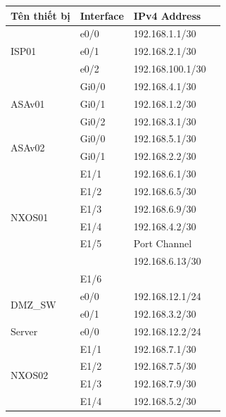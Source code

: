 \documentclass[13pt]{article}
\begin{document}
\begin{enumerate}
\begin{table}[h!]
    \centering
    \begin{tabular}{|p{3cm}|p{3cm}|p{4cm}|p{3cm}|}
        \hline
        \textbf{Tên thiết bị} & \textbf{Interface} & \textbf{IPv4 Address} \\ \hline
        \multirow{3}{*}{ISP01} & e0/0 & 192.168.1.1/30 \\ \cline{2-3}
                               & e0/1 & 192.168.2.1/30 \\ \cline{2-3}
                               & e0/2 & 192.168.100.1/30 \\ \hline
        \multirow{3}{*}{ASAv01} & Gi0/0 & 192.168.4.1/30 \\ \cline{2-3}
                                & Gi0/1 & 192.168.1.2/30 \\ \cline{2-3}
                                & Gi0/2 & 192.168.3.1/30 \\ \hline
        \multirow{2}{*}{ASAv02} & Gi0/0 & 192.168.5.1/30 \\ \cline{2-3}
                                & Gi0/1 & 192.168.2.2/30 \\ \hline
        \multirow{6}{*}{NXOS01} & E1/1 & 192.168.6.1/30 \\ \cline{2-3}
                                & E1/2 & 192.168.6.5/30 \\ \cline{2-3}
                                & E1/3 & 192.168.6.9/30 \\ \cline{2-3}
                                & E1/4 & 192.168.4.2/30 \\ \cline{2-3}
                                & E1/5 & Port Channel \\ 
                                &      & 192.168.6.13/30 \\ \cline{2-3}
                                & E1/6 & \\ \hline
        \multirow{2}{*}{DMZ\_SW} & e0/0 & 192.168.12.1/24 \\ \cline{2-3}
                                  & e0/1 & 192.168.3.2/30 \\ \hline
        Server                   & e0/0 & 192.168.12.2/24 \\ \hline
        \multirow{6}{*}{NXOS02} & E1/1 & 192.168.7.1/30 \\ \cline{2-3}
                                & E1/2 & 192.168.7.5/30 \\ \cline{2-3}
                                & E1/3 & 192.168.7.9/30 \\ \cline{2-3}
                                & E1/4 & 192.168.5.2/30 \\ \cline{2-3}

\end{tabular}
\end{table}
\end{enumerate}
\end{document}
